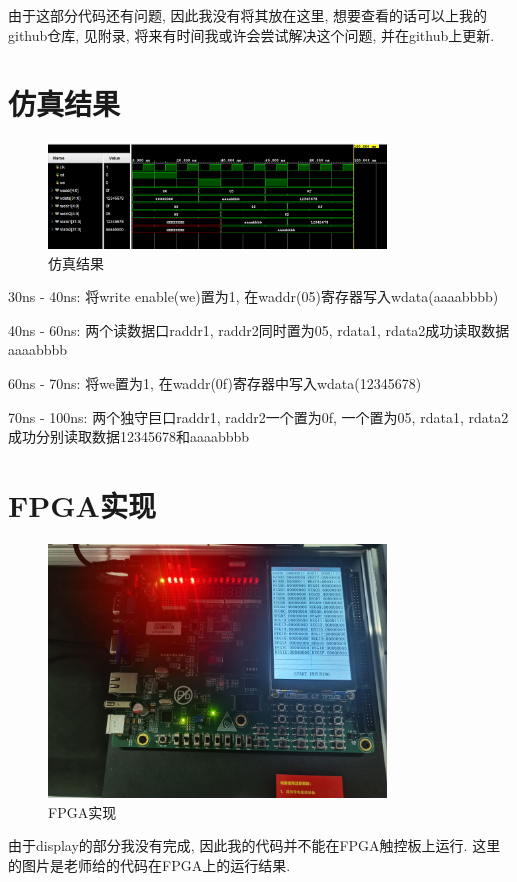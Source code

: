 \documentclass[AutoFakeBold]{LZUThesis}
\begin{document}
由于这部分代码还有问题, 因此我没有将其放在这里, 想要查看的话可以上我的github仓库, 见附录, 
将来有时间我或许会尝试解决这个问题, 并在github上更新.

\section{仿真结果}

\begin{figure}[htbp]
    \centering
    \includegraphics[width=0.8\textwidth]{img/sim_wave}
    \caption{仿真结果}
    \label{fig:sim}
\end{figure}
30ns - 40ns: 将write enable(we)置为1, 在waddr(05)寄存器写入wdata(aaaabbbb)

40ns - 60ns: 两个读数据口raddr1, raddr2同时置为05, rdata1, rdata2成功读取数据aaaabbbb

60ns - 70ns: 将we置为1, 在waddr(0f)寄存器中写入wdata(12345678)

70ns - 100ns: 两个独守巨口raddr1, raddr2一个置为0f, 一个置为05, rdata1, rdata2成功分别读取数据12345678和aaaabbbb

\section{FPGA实现}
\begin{figure}[htbp]
    \centering
    \includegraphics[width=0.8\textwidth]{img/fpga}
    \caption{FPGA实现}
    \label{fig:fpga}
\end{figure}
由于display的部分我没有完成, 因此我的代码并不能在FPGA触控板上运行.
这里的图片是老师给的代码在FPGA上的运行结果.
\end{document}
